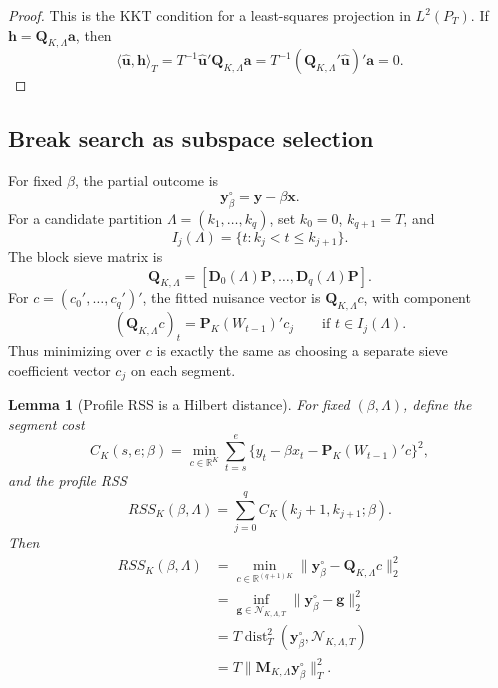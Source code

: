 \documentclass[12pt]{article}
\numberwithin{equation}{section}
\newtheorem{lemma}{Lemma}
\theoremstyle{definition}
\newcommand{\R}{\mathbb R}
\newcommand{\N}{\mathcal N}
\newcommand{\LtwoT}{L^2(P_T)}
\newcommand{\innerT}[2]{\langle #1,#2\rangle_T}
\begin{document}
\begin{proof}
This is the KKT condition for a least-squares projection in \(\LtwoT\). If
\(\bm h=\bm Q_{K,\Lambda}\bm a\), then
\[
    \innerT{\widehat{\bm u}}{\bm h}
    =T^{-1}\widehat{\bm u}'\bm Q_{K,\Lambda}\bm a
    =T^{-1}(\bm Q_{K,\Lambda}'\widehat{\bm u})'\bm a=0.
\]
\end{proof}

\subsection{Break search as subspace selection}

For fixed \(\beta\), the partial outcome is
\[
    \bm y_\beta^\circ=\bm y-\beta\bm x.
\]
For a candidate partition \(\Lambda=(k_1,\ldots,k_q)\), set \(k_0=0\),
\(k_{q+1}=T\), and
\[
    I_j(\Lambda)=\{t:k_j<t\le k_{j+1}\}.
\]
The block sieve matrix is
\[
    \bm Q_{K,\Lambda}
    =[\bm D_0(\Lambda)\bm P,\ldots,\bm D_q(\Lambda)\bm P].
\]
For \(c=(c_0',\ldots,c_q')'\), the fitted nuisance vector is
\(\bm Q_{K,\Lambda}c\), with component
\[
    (\bm Q_{K,\Lambda}c)_t
    =\bm P_K(W_{t-1})'c_j
    \qquad\text{if }t\in I_j(\Lambda).
\]
Thus minimizing over \(c\) is exactly the same as choosing a separate sieve
coefficient vector \(c_j\) on each segment.

\begin{lemma}[Profile RSS is a Hilbert distance]
\label{lem:rss-hilbert-distance}
For fixed \((\beta,\Lambda)\), define the segment cost
\[
    C_K(s,e;\beta)
    =\min_{c\in\R^K}
      \sum_{t=s}^e
      \{y_t-\beta x_t-\bm P_K(W_{t-1})'c\}^2,
\]
and the profile RSS
\[
    RSS_K(\beta,\Lambda)
    =\sum_{j=0}^q C_K(k_j+1,k_{j+1};\beta).
\]
Then
\begin{equation}
\begin{aligned}
    RSS_K(\beta,\Lambda)
    &=\min_{c\in\R^{(q+1)K}}
      \|\bm y_\beta^\circ-\bm Q_{K,\Lambda}c\|_2^2 \\
    &=\inf_{\bm g\in\N_{K,\Lambda,T}}
      \|\bm y_\beta^\circ-\bm g\|_2^2 \\
    &=T\operatorname{dist}_T^2
      (\bm y_\beta^\circ,\N_{K,\Lambda,T}) \\
    &=T\|\bm M_{K,\Lambda}\bm y_\beta^\circ\|_T^2.
\end{aligned}
\label{eq:rss-distance-equivalence}
\end{equation}
\end{lemma}
\end{document}
